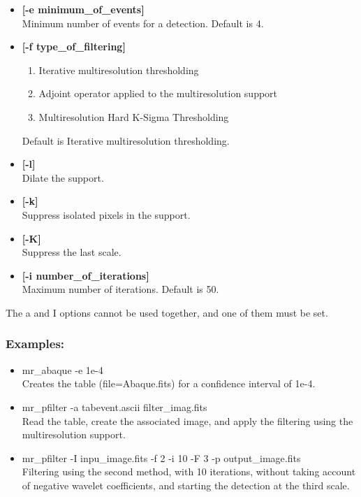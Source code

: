 \begin{itemize}
\begin{itemize}
Number of scales used in the multiresolution transform.
Default is 6.
\item {\bf [-e minimum\_of\_events]}  \\
Minimum number of events for a detection. Default is 4.
\item {\bf [-f type\_of\_filtering]}  
\begin{enumerate}
\baselineskip=0.4truecm
\item Iterative multiresolution thresholding 
\item Adjoint operator applied to the multiresolution support  
\item Multiresolution Hard K-Sigma Thresholding 
\end{enumerate}
Default is Iterative multiresolution thresholding.
\item {\bf [-l]} \\
Dilate the support. 
\item {\bf [-k]} \\
 Suppress isolated pixels in the support.
\item {\bf [-K]} \\       
Suppress the last scale.
\item {\bf [-i number\_of\_iterations]}  \\
 Maximum number of iterations. Default is 50.
\end{itemize}

\noindent
The a and I options cannot be used together, and one of them must be set.
\subsubsection*{Examples:}
\begin{itemize}
\baselineskip=0.4truecm
\itemsep=0.1truecm
\item mr\_abaque -e 1e-4 \\
Creates the table (file=Abaque.fits) for a confidence interval of 1e-4.
\item mr\_pfilter -a tabevent.ascii filter\_imag.fits\\
Read the table, create the associated image, and apply
the filtering using the multiresolution support.
\item mr\_pfilter  -I inpu\_image.fits -f 2 -i 10 -F 3 -p output\_image.fits \\
Filtering using the second method, with 10 iterations, without taking
account of negative wavelet coefficients, and starting the 
detection at the third
scale.
\end{itemize}


\end{itemize}

